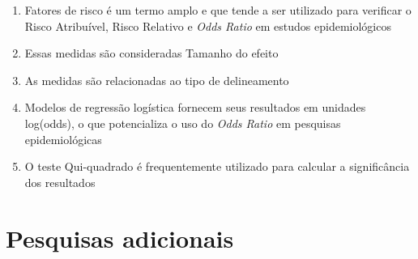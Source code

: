 \documentclass[
]{book}
\providecommand{\tightlist}{%
  \setlength{\itemsep}{0pt}\setlength{\parskip}{0pt}}
\begin{document}
\begin{enumerate}
\def\labelenumi{\arabic{enumi}.}
\tightlist
\item
  Fatores de risco é um termo amplo e que tende a ser utilizado para verificar o Risco Atribuível, Risco Relativo e \emph{Odds Ratio} em estudos epidemiológicos\\
\item
  Essas medidas são consideradas Tamanho do efeito\\
\item
  As medidas são relacionadas ao tipo de delineamento\\
\item
  Modelos de regressão logística fornecem seus resultados em unidades log(odds), o que potencializa o uso do \emph{Odds Ratio} em pesquisas epidemiológicas\\
\item
  O teste Qui-quadrado é frequentemente utilizado para calcular a significância dos resultados\\
\end{enumerate}

\hypertarget{pesquisas-adicionais-2}{%
\section{Pesquisas adicionais}\label{pesquisas-adicionais-2}}
\end{document}
